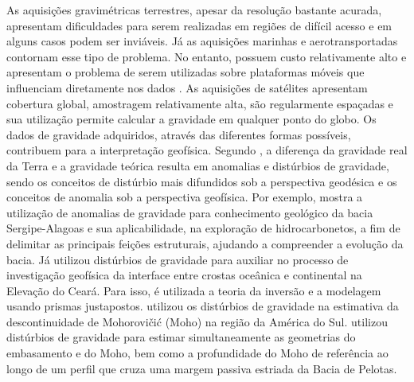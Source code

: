 As aquisições gravimétricas terrestres, apesar da resolução bastante acurada, apresentam dificuldades para serem realizadas em regiões de difícil acesso e em alguns casos podem ser inviáveis. Já as aquisições marinhas e aerotransportadas contornam esse tipo de problema. No entanto, possuem custo relativamente alto e apresentam o problema de serem utilizadas sobre plataformas móveis que influenciam diretamente nos dados \cite{carbonari2007, castro2018}. As aquisições de satélites apresentam cobertura global, amostragem relativamente alta, são regularmente espaçadas e sua utilização permite calcular a gravidade em qualquer ponto do globo. Os dados de gravidade adquiridos, através das diferentes formas possíveis, contribuem para a interpretação geofísica. Segundo , a diferença da gravidade real da Terra e a gravidade teórica resulta em anomalias e distúrbios de gravidade, sendo os conceitos de distúrbio mais difundidos sob a perspectiva geodésica e os conceitos de anomalia sob a perspectiva geofísica. Por exemplo,  mostra a utilização de anomalias de gravidade para conhecimento geológico da bacia Sergipe-Alagoas e sua aplicabilidade, na exploração de hidrocarbonetos, a fim de delimitar as principais feições estruturais, ajudando a compreender a evolução da bacia. Já  utilizou distúrbios de gravidade para auxiliar no processo de investigação geofísica da interface entre crostas oceânica e continental na Elevação do Ceará. Para isso, é utilizada a teoria da inversão e a modelagem usando prismas justapostos.  utilizou os distúrbios de gravidade na estimativa da descontinuidade de Mohorovičić (Moho) na região da América do Sul.  utilizou distúrbios de gravidade para estimar simultaneamente as geometrias do embasamento e do Moho, bem como a profundidade do Moho de referência ao longo de um perfil que cruza uma margem passiva estriada da Bacia de Pelotas.

